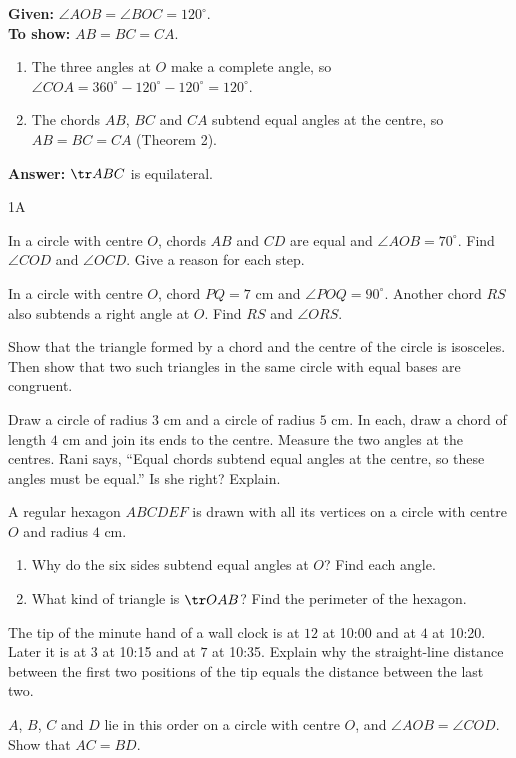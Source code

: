 \textbf{Given:} $\angle AOB=\angle BOC=120^\circ$.\\
\textbf{To show:} $AB=BC=CA$.
\begin{enumerate}[leftmargin=1.8em,itemsep=1pt]
  \item The three angles at $O$ make a complete angle, so $\angle COA=360^\circ-120^\circ-120^\circ=120^\circ$.
  \item The chords $AB$, $BC$ and $CA$ subtend equal angles at the centre, so $AB=BC=CA$ (Theorem 2).
\end{enumerate}
\textbf{Answer:} $\tr ABC$ is equilateral.

\begin{exercise}{1A}
\item In a circle with centre $O$, chords $AB$ and $CD$ are equal and $\angle AOB=70^\circ$. Find $\angle COD$ and $\angle OCD$. Give a reason for each step.
\item In a circle with centre $O$, chord $PQ=7$ cm and $\angle POQ=90^\circ$. Another chord $RS$ also subtends a right angle at $O$. Find $RS$ and $\angle ORS$.
\item Show that the triangle formed by a chord and the centre of the circle is isosceles. Then show that two such triangles in the same circle with equal bases are congruent.
\item Draw a circle of radius $3$ cm and a circle of radius $5$ cm. In each, draw a chord of length $4$ cm and join its ends to the centre. Measure the two angles at the centres. Rani says, ``Equal chords subtend equal angles at the centre, so these angles must be equal.'' Is she right? Explain.
\item A regular hexagon $ABCDEF$ is drawn with all its vertices on a circle with centre $O$ and radius $4$ cm.
  \begin{enumerate}[label=(\alph*),itemsep=1pt]
    \item Why do the six sides subtend equal angles at $O$? Find each angle.
    \item What kind of triangle is $\tr OAB$? Find the perimeter of the hexagon.
  \end{enumerate}
\item The tip of the minute hand of a wall clock is at $12$ at 10:00 and at $4$ at 10:20. Later it is at $3$ at 10:15 and at $7$ at 10:35. Explain why the straight-line distance between the first two positions of the tip equals the distance between the last two.
\item $A$, $B$, $C$ and $D$ lie in this order on a circle with centre $O$, and $\angle AOB=\angle COD$. Show that $AC=BD$.
\end{exercise}


